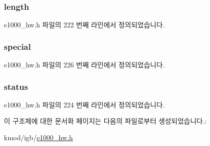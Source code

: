 \subsubsection[{\texorpdfstring{length}{length}}]{ length}\hypertarget{structe1000__rx__desc_adb05ebb496f195c1ce4e49f46fb420f0}{}\label{structe1000__rx__desc_adb05ebb496f195c1ce4e49f46fb420f0}


e1000\+\_\+hw.\+h 파일의 222 번째 라인에서 정의되었습니다.

\subsubsection[{\texorpdfstring{special}{special}}]{ special}\hypertarget{structe1000__rx__desc_a583ef448358a17812f8e8febe5da37a3}{}\label{structe1000__rx__desc_a583ef448358a17812f8e8febe5da37a3}


e1000\+\_\+hw.\+h 파일의 226 번째 라인에서 정의되었습니다.

\subsubsection[{\texorpdfstring{status}{status}}]{ status}\hypertarget{structe1000__rx__desc_aa648386576736be0dd25c95b6edd37d2}{}\label{structe1000__rx__desc_aa648386576736be0dd25c95b6edd37d2}


e1000\+\_\+hw.\+h 파일의 224 번째 라인에서 정의되었습니다.



이 구조체에 대한 문서화 페이지는 다음의 파일로부터 생성되었습니다.\+:\begin{DoxyCompactItemize}
\item 
kmod/igb/\hyperlink{kmod_2igb_2e1000__hw_8h}{e1000\+\_\+hw.\+h}\end{DoxyCompactItemize}
